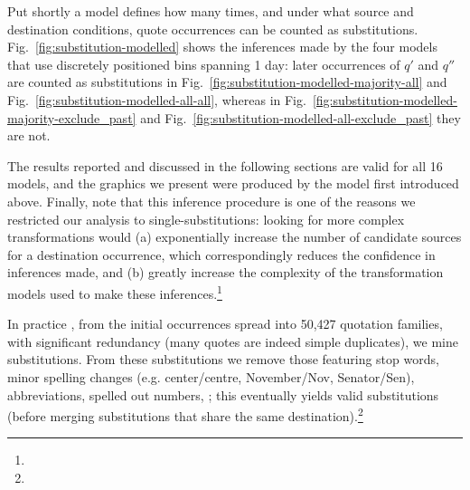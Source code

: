 \begin{new}

Put shortly a model defines how many times, and under what source and destination conditions, quote occurrences can be counted as substitutions.
Fig.~\ref{fig:substitution-modelled} shows the inferences made by the four models that use discretely positioned bins spanning 1 day:
later occurrences of $q'$ and $q''$ are counted as substitutions in Fig.~\ref{fig:substitution-modelled-majority-all} and Fig.~\ref{fig:substitution-modelled-all-all}, whereas in Fig.~\ref{fig:substitution-modelled-majority-exclude_past} and Fig.~\ref{fig:substitution-modelled-all-exclude_past} they are not.

The results reported and discussed in the following sections are valid for all 16 models, and the graphics we present were produced by the model first introduced above.
Finally, note that this inference procedure is one of the reasons we restricted our analysis to single-substitutions:
looking for more complex transformations would
(a) exponentially increase the number of candidate sources for a destination occurrence, which correspondingly reduces the confidence in inferences made,
and (b) greatly increase the complexity of the transformation models used to make these inferences.\footnote{
}

\end{new}

\medskip

In practice , from the  initial occurrences spread into 50,427 quotation families, with significant redundancy (many quotes are indeed simple duplicates), we mine  substitutions.
From these substitutions we remove those featuring stop words, minor spelling changes (e.g. center/centre, November/Nov, Senator/Sen), abbreviations, spelled out numbers, ;
this eventually yields  valid substitutions (before merging substitutions that share the same destination).\footnote{
}


